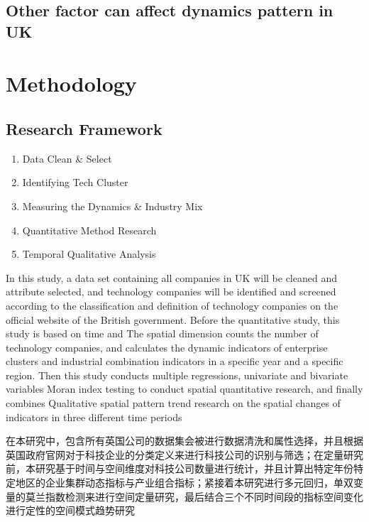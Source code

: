 \documentclass[
  12pt,
  oneside]{book}
\providecommand{\tightlist}{%
  \setlength{\itemsep}{0pt}\setlength{\parskip}{0pt}}
\begin{document}
\hypertarget{other-factor-can-affect-dynamics-pattern-in-uk}{%
\section{Other factor can affect dynamics pattern in UK}\label{other-factor-can-affect-dynamics-pattern-in-uk}}

\hypertarget{methodology}{%
\chapter{Methodology}\label{methodology}}

\hypertarget{research-framework}{%
\section{Research Framework}\label{research-framework}}

\begin{enumerate}
\def\labelenumi{\arabic{enumi}.}
\tightlist
\item
  Data Clean \& Select
\item
  Identifying Tech Cluster
\item
  Measuring the Dynamics \& Industry Mix
\item
  Quantitative Method Research
\item
  Temporal Qualitative Analysis
\end{enumerate}

In this study, a data set containing all companies in UK will be cleaned and attribute selected, and technology companies will be identified and screened according to the classification and definition of technology companies on the official website of the British government. Before the quantitative study, this study is based on time and The spatial dimension counts the number of technology companies, and calculates the dynamic indicators of enterprise clusters and industrial combination indicators in a specific year and a specific region. Then this study conducts multiple regressions, univariate and bivariate variables Moran index testing to conduct spatial quantitative research, and finally combines Qualitative spatial pattern trend research on the spatial changes of indicators in three different time periods

在本研究中，包含所有英国公司的数据集会被进行数据清洗和属性选择，并且根据英国政府官网对于科技企业的分类定义来进行科技公司的识别与筛选；在定量研究前，本研究基于时间与空间维度对科技公司数量进行统计，并且计算出特定年份特定地区的企业集群动态指标与产业组合指标；紧接着本研究进行多元回归，单双变量的莫兰指数检测来进行空间定量研究，最后结合三个不同时间段的指标空间变化进行定性的空间模式趋势研究
\end{document}
